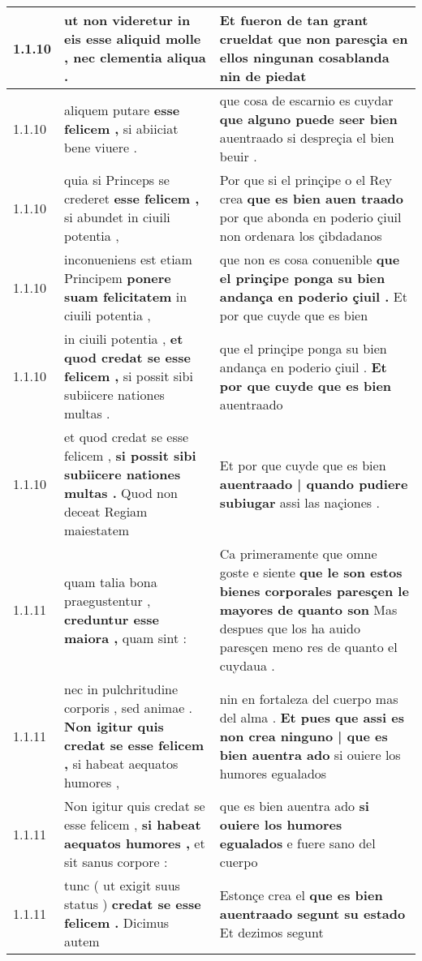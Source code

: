 \begin{tabular}{|p{1cm}|p{6.5cm}|p{6.5cm}|}
1.1.10 & ut non videretur in eis \textbf{ esse aliquid molle , } nec clementia aliqua . & Et fueron de tan grant crueldat \textbf{ que non paresçia en ellos ningunan cosablanda } nin de piedat \\\hline
1.1.10 & aliquem putare \textbf{ esse felicem , } si abiiciat bene viuere . & que cosa de escarnio es cuydar \textbf{ que alguno puede seer bien } auentraado si despreçia el bien beuir . \\\hline
1.1.10 & quia si Princeps se crederet \textbf{ esse felicem , } si abundet in ciuili potentia , & Por que si el prinçipe o el Rey crea \textbf{ que es bien auen traado } por que abonda en poderio çiuil non ordenara los çibdadanos \\\hline
1.1.10 & inconueniens est etiam Principem \textbf{ ponere suam felicitatem } in ciuili potentia , & que non es cosa conuenible \textbf{ que el prinçipe ponga su bien andança en poderio çiuil . } Et por que cuyde que es bien \\\hline
1.1.10 & in ciuili potentia , \textbf{ et quod credat se esse felicem , } si possit sibi subiicere nationes multas . & que el prinçipe ponga su bien andança en poderio çiuil . \textbf{ Et por que cuyde que es bien } auentraado \\\hline
1.1.10 & et quod credat se esse felicem , \textbf{ si possit sibi subiicere nationes multas . } Quod non deceat Regiam maiestatem & Et por que cuyde que es bien \textbf{ auentraado | quando pudiere subiugar } assi las naçiones . \\\hline
1.1.11 & quam talia bona praegustentur , \textbf{ creduntur esse maiora , } quam sint : & Ca primeramente que omne goste e siente \textbf{ que le son estos bienes corporales paresçen le mayores de quanto son } Mas despues que los ha auido paresçen meno res de quanto el cuydaua . \\\hline
1.1.11 & nec in pulchritudine corporis , sed animae . \textbf{ Non igitur quis credat se esse felicem , } si habeat aequatos humores , & nin en fortaleza del cuerpo mas del alma . \textbf{ Et pues que assi es non crea ninguno | que es bien auentra ado } si ouiere los humores egualados \\\hline
1.1.11 & Non igitur quis credat se esse felicem , \textbf{ si habeat aequatos humores , } et sit sanus corpore : & que es bien auentra ado \textbf{ si ouiere los humores egualados } e fuere sano del cuerpo \\\hline
1.1.11 & tunc ( ut exigit suus status ) \textbf{ credat se esse felicem . } Dicimus autem & Estonçe crea el \textbf{ que es bien auentraado segunt su estado } Et dezimos segunt \\\hline

\end{tabular}
